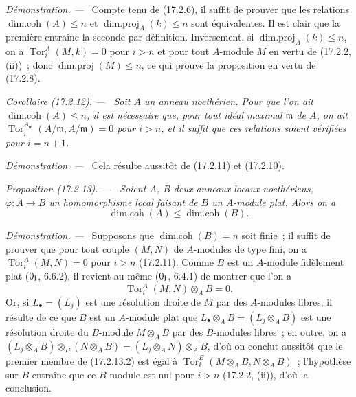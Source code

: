 \documentclass[10pt,oneside]{book}
\makeatletter
\newcommand{\setmanualcurrentlabel}[1]{\def\@currentlabel{#1}}
\newcommand{\oldpage}[2][]{%
  \setcounter{footnote}{0}%
  \marginpar{\scriptsize\textbf{#1}~|~#2}\ignorespaces}
\newenvironment{proposition}[1][]{%
  \setmanualcurrentlabel{#1}\par\medskip\noindent\itshape Proposition (#1). ---\ }{\par}
\newenvironment{corollary}[1][]{%
  \setmanualcurrentlabel{#1}\par\medskip\noindent\itshape Corollaire (#1). ---\ }{\par}
\newenvironment{proof}{%
  \par\medskip\noindent\textit{Démonstration. ---\ }}{\par}
\makeatother
\begin{document}
\begin{proof}
Compte tenu de (17.2.6), il suffit de prouver que les relations
$\operatorname{dim.coh}(A)\leq n$ et
$\operatorname{dim.proj}_A(k)\leq n$ sont équivalentes. Il est clair que la
première entraîne la seconde par définition. Inversement, si
$\operatorname{dim.proj}_A(k)\leq n$, on a
$\operatorname{Tor}^A_i(M,k)=0$ pour $i>n$ et pour tout $A$-module $M$ en
vertu de (17.2.2, (ii))~; donc $\operatorname{dim.proj}(M)\leq n$, ce qui
prouve la proposition en vertu de (17.2.8).
\end{proof}

\begin{corollary}[17.2.12]
\label{0.17.2.12-fr}
Soit $A$ un anneau noethérien. Pour que l'on ait
$\operatorname{dim.coh}(A)\leq n$, il est nécessaire que, pour tout idéal
maximal $\mathfrak{m}$ de $A$, on ait
$\operatorname{Tor}^{A_{\mathfrak{m}}}_i(A/\mathfrak{m},A/\mathfrak{m})=0$
pour $i>n$, et il suffit que ces relations soient vérifiées pour $i=n+1$.
\end{corollary}

\begin{proof}
Cela résulte aussitôt de (17.2.11) et (17.2.10).
\end{proof}

\begin{proposition}[17.2.13]
\label{0.17.2.13-fr}
Soient $A$, $B$ deux anneaux locaux noethériens,
$\varphi:A\longrightarrow B$ un homomorphisme local faisant de $B$ un
$A$-module plat. Alors on a
\begin{equation}
\label{0.17.2.13.1-fr}
\tag{17.2.13.1}
  \operatorname{dim.coh}(A)\leq\operatorname{dim.coh}(B).
\end{equation}
\end{proposition}

\begin{proof}
Supposons que $\operatorname{dim.coh}(B)=n$ soit finie~; il suffit de prouver
que pour tout couple $(M,N)$ de $A$-modules de type fini, on a
$\operatorname{Tor}^A_i(M,N)=0$ pour $i>n$ (17.2.11). Comme $B$ est un
$A$-module fidèlement plat ($0_{\rm I}$, 6.6.2), il revient au même
($0_{\rm I}$, 6.4.1) de montrer que l'on a
\begin{equation}
\label{0.17.2.13.2-fr}
\tag{17.2.13.2}
  \operatorname{Tor}^A_i(M,N)\otimes_A B=0.
\end{equation}
Or, si $L_\bullet=(L_j)$ est une résolution droite de $M$ par des $A$-modules
libres, il résulte de ce que $B$ est un $A$-module plat que
$L_\bullet\otimes_A B=(L_j\otimes_A B)$ est une résolution droite du
$B$-module $M\otimes_A B$ par des $B$-modules libres~; en outre, on a
$(L_j\otimes_A B)\otimes_B(N\otimes_A B)
=(L_j\otimes_A N)\otimes_A B$, d'où on conclut aussitôt que le premier membre
\oldpage[0\textsubscript{IV-1}]{46}
de (17.2.13.2) est égal à
$\operatorname{Tor}^B_i(M\otimes_A B,N\otimes_A B)$~; l'hypothèse sur $B$
entraîne que ce $B$-module est nul pour $i>n$ (17.2.2, (ii)), d'où la
conclusion.
\end{proof}
\end{document}
